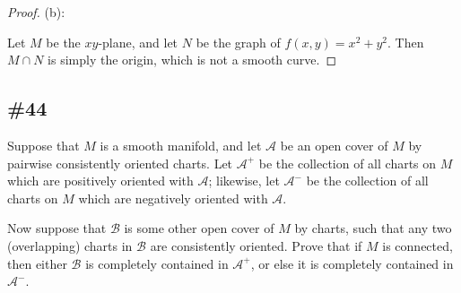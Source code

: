 \documentclass{article}
\theoremstyle{plain} %
\numberwithin{thm}{section} %
\theoremstyle{definition}
\begin{document}
\begin{proof}
        \medskip

        (b):

        Let \(M\) be the \(xy\)-plane, and let \(N\) be the graph of \(f(x,y) = x^2 + y^2\). Then \(M \cap N\) is simply the origin, which is not a smooth curve.

        \end{proof}
        \newpage
        \subsection{\#44}
        Suppose that $M$ is a smooth manifold, and let $\mathcal{A}$ be an open cover of $M$ by pairwise consistently oriented charts. Let $\mathcal{A}^+$ be the collection of all charts on $M$ which are positively oriented with $\mathcal{A}$; likewise, let $\mathcal{A}^-$ be the collection of all charts on $M$ which are negatively oriented with $\mathcal{A}$.

        Now suppose that $\mathcal{B}$ is some other open cover of $M$ by charts, such that any two (overlapping) charts in $\mathcal{B}$ are consistently oriented. Prove that if $M$ is connected, then either $\mathcal{B}$ is completely contained in $\mathcal{A}^+$, or else it is completely contained in $\mathcal{A}^-$.
\end{document}
